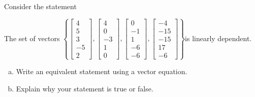 
\begin{exerciseStatement}


Consider the statement 
\begin{center}\begin{minipage}{0.8\textwidth}
 The set of vectors \( \left\{ \left[\begin{array}{c}
4 \\
5 \\
3 \\
-5 \\
2
\end{array}\right] , \left[\begin{array}{c}
4 \\
0 \\
-3 \\
1 \\
0
\end{array}\right] , \left[\begin{array}{c}
0 \\
-1 \\
1 \\
-6 \\
-6
\end{array}\right] , \left[\begin{array}{c}
-4 \\
-15 \\
-15 \\
17 \\
-6
\end{array}\right] \right\} \)is linearly dependent.
\end{minipage}\end{center}
    


\begin{enumerate}[(a)]
\item  Write an equivalent statement using a vector equation.
\item  Explain why your statement is true or false.
\end{enumerate}
    
\end{exerciseStatement}
    

